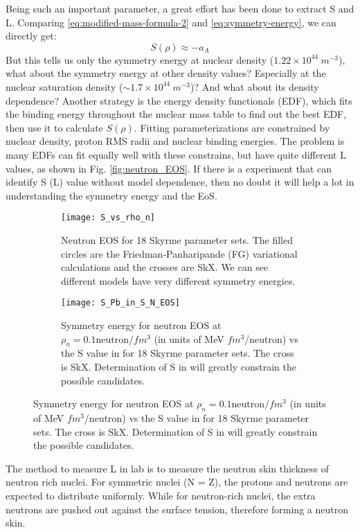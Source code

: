 Being such an important parameter, a great effort has been done to extract S 
and L. Comparing \eqref{eq:modified-mass-formula-2} and \eqref{eq:symmetry-energy},
we can directly get:
\begin{equation}
    S(\rho) \approx -a_A
\end{equation}
But this tells us only the symmetry energy at nuclear density ($1.22 \times 10^{44}\ m^{-3}$),
what about the symmetry energy at other density values? Especially at the nuclear
saturation density ($\sim 1.7 \times 10^{44}\ m^{-3}$)? And what about its density
dependence? Another strategy is the energy density functionals (EDF), which fits
the binding energy throughout the nuclear mass table to find out the best EDF,
then use it to calculate $S(\rho)$. Fitting parameterizations are constrained
by nuclear density, proton RMS radii and nuclear binding energies. 
The problem is many EDFs can fit equally well with these constrains, but have quite 
different L values, as shown in Fig. \ref{fig:neutron_EOS}.
If there is a experiment that can identify S (L) value without model dependence, 
then no doubt it will help a lot in understanding the symmetry energy and the EoS.
\begin{figure}
    \begin{subfigure}[c]{0.5\textwidth}
	\texttt{[image: S\_vs\_rho\_n]}
	\caption{Neutron EOS for 18 Skyrme parameter sets. The filled circles are
	the Friedman-Panharipande (FG) variational calculations and the crosses are SkX. 
	\cite{PhysRevSTAB.7.042802}
	We can see different models have very different symmetry energies.
	}
    \end{subfigure}
    \begin{subfigure}[c]{0.5\textwidth}
	\texttt{[image: S\_Pb\_in\_S\_N\_EOS]}
	\caption{Symmetry energy for neutron EOS at $\rho_n = 0.1 \text{neutron}/fm^3$
	(in units of MeV $fm^3$/neutron) vs the S value in \Pb for 18 Skyrme parameter sets. 
	The cross is SkX. Determination of S in \Pb will greatly constrain the 
	possible candidates.}
    \end{subfigure}
\end{figure}

The method to measure L in lab is to measure the neutron skin thickness of 
neutron rich nuclei. For symmetric nuclei (N = Z), the protons and neutrons are
expected to distribute uniformly. While for neutron-rich nuclei, the extra 
neutrons are pushed out against the surface tension\cite{PRL.85.5296}, therefore
forming a neutron skin. 

